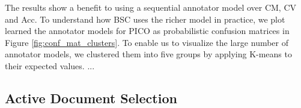 The results show a benefit to using a sequential annotator model over CM, CV and Acc.
To understand how BSC uses the richer model in practice, we plot learned the annotator models for
PICO as probabilistic confusion matrices in Figure \ref{fig:conf_mat_clusters}.
To enable us to visualize the large number of annotator models, we clustered them into five groups by
applying K-means  to their expected values.
...


%

\subsection{Active Document Selection}

